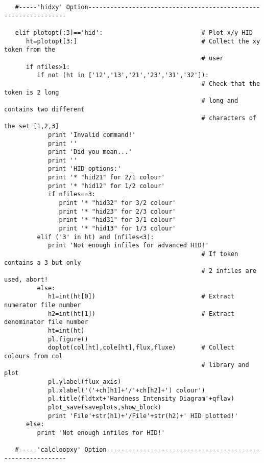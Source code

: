 \begin{verbatim}
   #-----'hidxy' Option----------------------------------------------------------------

   elif plotopt[:3]=='hid':                           # Plot x/y HID
      ht=plotopt[3:]                                  # Collect the xy token from the
                                                      # user
      if nfiles>1:
         if not (ht in ['12','13','21','23','31','32']):
                                                      # Check that the token is 2 long
                                                      # long and contains two different
                                                      # characters of the set [1,2,3]
            print 'Invalid command!'
            print ''
            print 'Did you mean...'
            print ''
            print 'HID options:'
            print '* "hid21" for 2/1 colour'
            print '* "hid12" for 1/2 colour'
            if nfiles==3:
               print '* "hid32" for 3/2 colour'
               print '* "hid23" for 2/3 colour'
               print '* "hid31" for 3/1 colour'
               print '* "hid13" for 1/3 colour'
         elif ('3' in ht) and (nfiles<3):
            print 'Not enough infiles for advanced HID!'
                                                      # If token contains a 3 but only
                                                      # 2 infiles are used, abort!
         else:
            h1=int(ht[0])                             # Extract numerator file number
            h2=int(ht[1])                             # Extract denominator file number
            ht=int(ht)
            pl.figure()
            doplot(col[ht],cole[ht],flux,fluxe)       # Collect colours from col
                                                      # library and plot
            pl.ylabel(flux_axis)
            pl.xlabel('('+ch[h1]+'/'+ch[h2]+') colour')
            pl.title(fldtxt+'Hardness Intensity Diagram'+qflav)
            plot_save(saveplots,show_block)
            print 'File'+str(h1)+'/File'+str(h2)+' HID plotted!'
      else:
         print 'Not enough infiles for HID!'

   #-----'calcloopxy' Option-----------------------------------------------------------


\end{verbatim}
